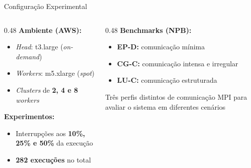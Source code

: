 \documentclass[brazil,aspectratio=169]{lapesd-slides}
\begin{document}
\begin{frame}{Configuração Experimental}
    \begin{columns}
        \begin{column}{0.48\textwidth}
            \textbf{Ambiente (AWS):}
            \begin{itemize}
                \item \textit{Head}: t3.large (\textit{on-demand})
                \item \textit{Workers}: m5.xlarge (\textit{spot})
                \item \textit{Clusters} de \textbf{2, 4 e 8} \textit{workers}
            \end{itemize}
            \vspace{0.6em}
            \textbf{Experimentos:}
            \begin{itemize}
                \item Interrupções aos \textbf{10\%, 25\% e 50\%} da execução
                \item \textbf{282 execuções} no total
            \end{itemize}
        \end{column}
        \begin{column}{0.48\textwidth}
            \textbf{Benchmarks (NPB):}
            \begin{itemize}
                \item \textbf{EP-D:} comunicação mínima
                \item \textbf{CG-C:} comunicação intensa e irregular
                \item \textbf{LU-C:} comunicação estruturada
            \end{itemize}
            \vspace{0.6em}
            \small Três perfis distintos de comunicação MPI para avaliar o sistema em diferentes cenários
        \end{column}
    \end{columns}
\end{frame}
\end{document}
